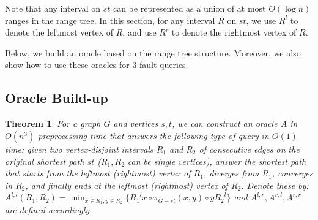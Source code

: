 \documentclass[11pt]{article}
\theoremstyle{plain}
\newtheorem{theorem}{Theorem}[section]
\theoremstyle{definition}
\newcommand{\too}[1]{\tilde{O}({#1})}
\newcommand{\zdd}[1]{{#1}^{l}}
\begin{document}
Note that any interval on $st$ can be represented as a union of at most $O(\log n)$ ranges in the range tree. In this section, for any interval $R$ on $st$, we use $R^l$ to denote the leftmost vertex of $R$, and use $R^r$ to denote the rightmost vertex of $R$.

Below, we build an oracle based on the range tree structure. Moreover, we also show how to use these oracles for 3-fault queries.

\subsection{Oracle Build-up}\label{sec:3-fault-oracle}



\begin{theorem}\label{thm:oracle-A}
   For a graph $G$ and vertices $s,t$, we can construct an oracle $A$ in $\too{n^3}$ preprocessing time that answers the following type of query in $\too{1}$ time: given two vertex-disjoint intervals $R_1$ and $R_2$ of consecutive edges on the original shortest path $st$ ($R_1, R_2$ can be single vertices), answer the shortest path that starts from the leftmost (rightmost) vertex of $R_1$, diverges from $R_1$, converges in $R_2$, and finally ends at the leftmost (rightmost) vertex of $R_2$. Denote these by: $A^{l,l}(R_1,R_2) = \min_{x\in R_1, y\in R_2}\{\zdd{R_1}x\circ \pi_{G-st}(x, y) \circ y\zdd{R_2}\}$ and $A^{l,r},A^{r,l},A^{r,r}$ are defined accordingly.   
\end{theorem}
\end{document}

